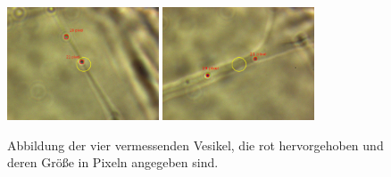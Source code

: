         \begin{figure}[h]
        \centering
        \includegraphics[width = 0.4\textwidth]{pictures/vesikel_size_1.png}
        \includegraphics[width = 0.4\textwidth]{pictures/vesikel_size_2.png}
        \caption{Abbildung der vier vermessenden Vesikel, die rot hervorgehoben und deren Größe in Pixeln angegeben sind.}
        \label{fig:vesikel_size}
        \end{figure}

